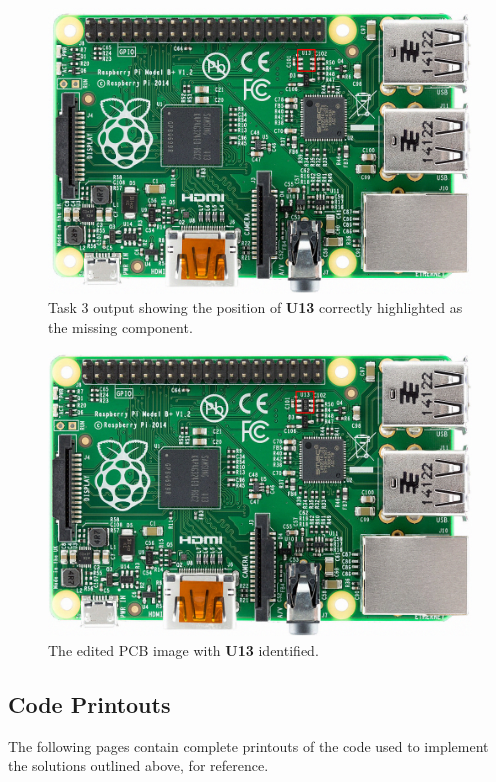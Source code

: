 \documentclass[conference]{IEEEtran}
\begin{document}
\begin{figure}[H]
\centering
\includegraphics[width=5in]{t3_missing}
\caption{Task 3 output showing the position of \textbf{U13} correctly highlighted as the missing component.}
\label{fig:t3_missing}
\end{figure}
\begin{figure}[H]
\centering
\includegraphics[width=5in]{t3_complete}
\caption{The edited PCB image with \textbf{U13} identified.}
\label{fig:t3_complete}
\end{figure}
\subsection{Code Printouts}
The following pages contain complete printouts of the code used to implement the solutions outlined above, for reference.



\end{document}

